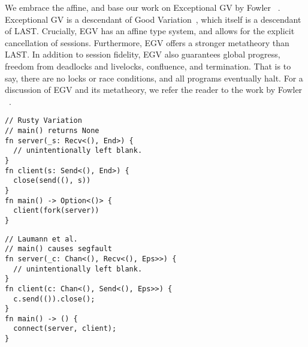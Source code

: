\documentclass[copyright,creativecommons]{eptcs}
\begin{document}
We embrace the affine, and base our work on Exceptional GV by Fowler \etal~\cite[EGV]{fowler2019}. Exceptional GV is a descendant of Good Variation~\cite[GV]{wadler2012}, which itself is a descendant of LAST. Crucially, EGV has an affine type system, and allows for the explicit cancellation of sessions. Furthermore, EGV offers a stronger metatheory than LAST. In addition to session fidelity, EGV also guarantees global progress, freedom from deadlocks and livelocks, confluence, and termination. That is to say, there are no locks or race conditions, and all programs eventually halt. For a discussion of EGV and its metatheory, we refer the reader to the work by Fowler \etal~\cite{fowler2019}.

\vspace{-0.5\baselineskip}
\begin{minipage}[t]{0.5\linewidth}
\begin{lstlisting}
// Rusty Variation
// main() returns None
fn server(_s: Recv<(), End>) {
  // unintentionally left blank.
}
fn client(s: Send<(), End>) {
  close(send((), s))
}
fn main() -> Option<()> {
  client(fork(server))
}
\end{lstlisting}
\end{minipage}%
\begin{minipage}[t]{0.5\linewidth}
\begin{lstlisting}
// Laumann et al.
// main() causes segfault
fn server(_c: Chan<(), Recv<(), Eps>>) {
  // unintentionally left blank.
}
fn client(c: Chan<(), Send<(), Eps>>) {
  c.send(()).close();
}
fn main() -> () {
  connect(server, client);
}
\end{lstlisting}
\end{minipage}%
\end{document}
